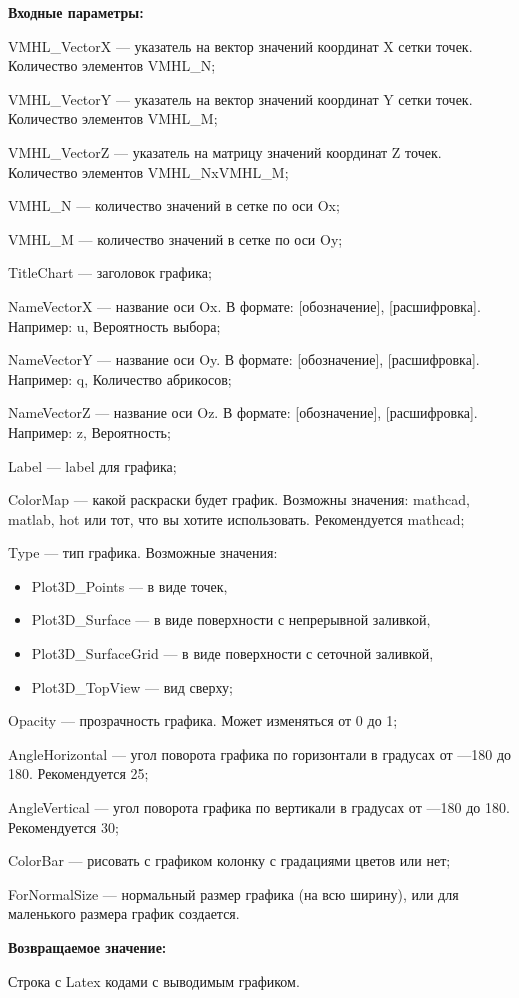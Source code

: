 \textbf{Входные параметры:}
 
VMHL\_VectorX --- указатель на вектор значений координат X сетки точек. Количество элементов VMHL\_N;
 
VMHL\_VectorY --- указатель на вектор значений координат Y сетки точек. Количество элементов VMHL\_M;
 
VMHL\_VectorZ --- указатель на матрицу значений координат Z точек. Количество элементов VMHL\_NxVMHL\_M;
 
VMHL\_N --- количество значений в сетке по оси Ox;
 
VMHL\_M --- количество значений в сетке по оси Oy;
 
TitleChart --- заголовок графика;
 
NameVectorX --- название оси Ox. В формате: [обозначение], [расшифровка]. Например: u, Вероятность выбора;
 
NameVectorY --- название оси Oy. В формате: [обозначение], [расшифровка]. Например: q, Количество абрикосов;
 
NameVectorZ --- название оси Oz. В формате: [обозначение], [расшифровка]. Например: z, Вероятность;
 
Label --- label для графика;
 
ColorMap --- какой раскраски будет график. Возможны значения: mathcad, matlab, hot или тот, что вы хотите использовать. Рекомендуется mathcad;
 
Type --- тип графика. Возможные значения:

\begin{itemize}
\item Plot3D\_Points --- в виде точек,
 
\item Plot3D\_Surface --- в виде поверхности с непрерывной заливкой,
 
\item Plot3D\_SurfaceGrid --- в виде поверхности с сеточной заливкой,
 
\item Plot3D\_TopView --- вид сверху;
\end{itemize}
 
Opacity --- прозрачность графика. Может изменяться от 0 до 1;
 
AngleHorizontal --- угол поворота графика по горизонтали в градусах от ---180 до 180. Рекомендуется 25;
 
AngleVertical --- угол поворота графика по вертикали в градусах от ---180 до 180. Рекомендуется 30;
 
ColorBar --- рисовать с графиком колонку с градациями цветов или нет;
 
ForNormalSize --- нормальный размер графика (на всю ширину), или для маленького размера график создается.
	
\textbf{Возвращаемое значение:}

Строка с Latex кодами с выводимым графиком.